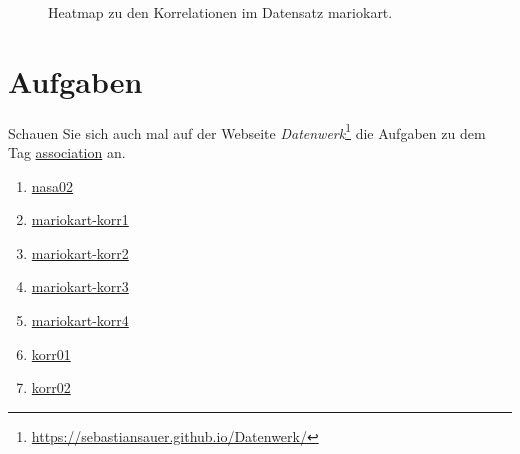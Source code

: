 \documentclass[
  letterpaper,
  oneside,
  open=any]{scrbook}
\providecommand{\tightlist}{%
  \setlength{\itemsep}{0pt}\setlength{\parskip}{0pt}}\usepackage{longtable,booktabs,array}
\theoremstyle{definition}
\theoremstyle{definition}
\theoremstyle{definition}
\theoremstyle{remark}
\begin{document}
\begin{figure}[H]


\caption{\label{fig-mario-corr-pdf}Heatmap zu den Korrelationen im
Datensatz mariokart.}

\end{figure}%

\section{Aufgaben}\label{aufgaben-6}

Schauen Sie sich auch mal auf der Webseite \emph{Datenwerk}\footnote{\url{https://sebastiansauer.github.io/Datenwerk/}}
die Aufgaben zu dem Tag
\href{https://sebastiansauer.github.io/Datenwerk/\#category=association}{association}
an.

\begin{enumerate}
\def\labelenumi{\arabic{enumi}.}
\tightlist
\item
  \href{https://sebastiansauer.github.io/Datenwerk/posts/nasa02/nasa02.html}{nasa02}
\item
  \href{https://sebastiansauer.github.io/Datenwerk/posts/mariokart-korr1/mariokart-korr1.html}{mariokart-korr1}
\item
  \href{https://sebastiansauer.github.io/Datenwerk/posts/mariokart-korr2/mariokart-korr2.html}{mariokart-korr2}
\item
  \href{https://sebastiansauer.github.io/Datenwerk/posts/mariokart-korr3/mariokart-korr3.html}{mariokart-korr3}
\item
  \href{https://sebastiansauer.github.io/Datenwerk/posts/mariokart-korr4/mariokart-korr4.html}{mariokart-korr4}
\item
  \href{https://sebastiansauer.github.io/Datenwerk/posts/korr01/korr01.html}{korr01}
\item
  \href{https://sebastiansauer.github.io/Datenwerk/posts/korr02/korr02.html}{korr02}
\end{enumerate}
\end{document}

